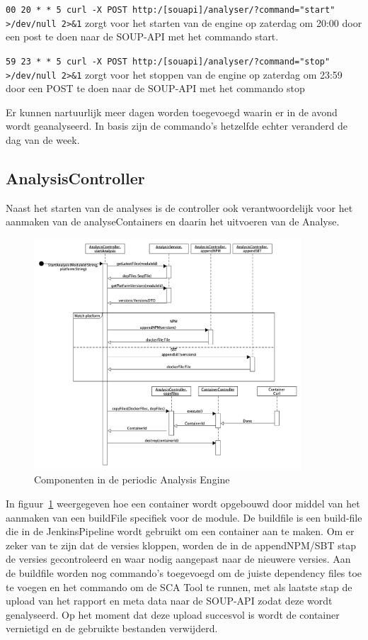 \texttt{00 20 * * 5 curl -X POST http:/[souapi]/analyser/?command="start" >/dev/null 2>\&1} zorgt voor het starten van de engine op zaterdag om 20:00 door een post te doen naar de SOUP-API met het commando start.

\texttt{59 23 * * 5 curl -X POST http:/[souapi]/analyser/?command="stop" >/dev/null 2>\&1} zorgt voor het stoppen van de engine op zaterdag om 23:59 door een POST te doen naar de SOUP-API met het commando stop

Er kunnen nartuurlijk meer dagen worden toegevoegd waarin er in de avond wordt geanalyseerd. In basis zijn de commando's hetzelfde echter veranderd de dag van de week.

\subsection{AnalysisController}\label{subsec:analysiscontroller}
Naast het starten van de analyses is de controller ook verantwoordelijk voor het aanmaken van de analyseContainers en daarin het uitvoeren van de Analyse.
\begin{figure}[bth]
    \myfloatalign
    \includegraphics[width=10cm]{gfx/umlet/exports/PAE-CreateContainer}
    \caption{Componenten in de periodic Analysis Engine}
    \label{fig:paeSeq}
\end{figure}
In figuur~\ref{fig:paeSeq} weergegeven hoe een container wordt opgebouwd door middel van het aanmaken van een buildFile specifiek voor de module. De buildfile is een build-file die in de JenkinsPipeline wordt gebruikt om een container aan te maken. Om er zeker van te zijn dat de versies kloppen, worden de in de appendNPM/SBT stap de versies gecontroleerd en waar nodig aangepast naar de nieuwere versies. Aan de buildfile worden nog commando's toegevoegd om de juiste dependency files toe te voegen en het commando om de SCA Tool te runnen, met als laatste stap de upload van het rapport en meta data naar de SOUP-API zodat deze wordt genalyseerd. Op het moment dat deze upload succesvol is wordt de container vernietigd en de gebruikte bestanden verwijderd.
%

